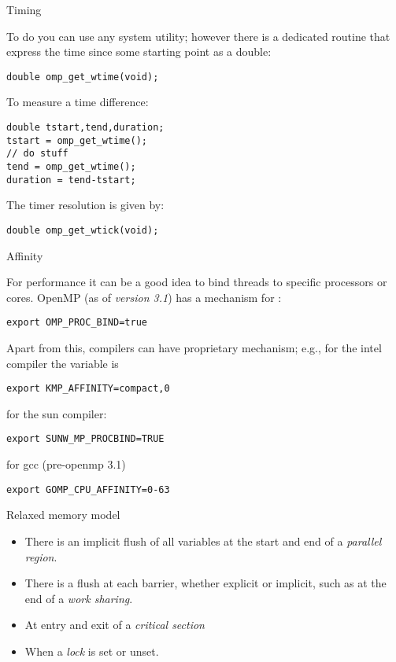  {Timing}

To do  you can use any system utility;
however there is a dedicated routine 
that express the time since some starting point as a double:
\begin{verbatim}
double omp_get_wtime(void);
\end{verbatim}
To measure a time difference:
\begin{verbatim}
double tstart,tend,duration;
tstart = omp_get_wtime();
// do stuff
tend = omp_get_wtime();
duration = tend-tstart;
\end{verbatim}
The timer resolution is given by:
\begin{verbatim}
double omp_get_wtick(void);
\end{verbatim}

 {Affinity}

For performance it can be a good idea to bind threads to specific
processors or cores.  OpenMP (as of \emph{version 3.1}) has a
mechanism for :
\begin{verbatim}
export OMP_PROC_BIND=true  
\end{verbatim}
Apart from this, compilers can have proprietary mechanism; 
e.g., for the intel compiler the variable is
\begin{verbatim}
export KMP_AFFINITY=compact,0
\end{verbatim}
for the sun compiler:
\begin{verbatim}
export SUNW_MP_PROCBIND=TRUE
\end{verbatim}
for gcc (pre-openmp 3.1)
\begin{verbatim}
export GOMP_CPU_AFFINITY=0-63
\end{verbatim}

 {Relaxed memory model}


\begin{itemize}
\item There is an implicit flush of all variables at the start and end 
  of a \emph{parallel region}.
\item There is a flush at each barrier, whether explicit or implicit,
  such as at the end of a \emph{work sharing}.
\item At entry and exit of a \emph{critical section}
\item When a \emph{lock} is set or unset.
\end{itemize}

